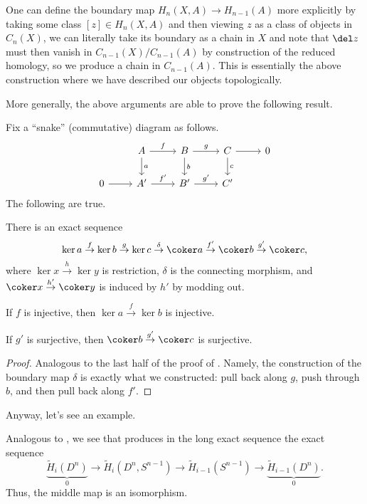 \documentclass[../notes.tex]{subfiles}
\begin{document}
\begin{remark}
	One can define the boundary map $H_n(X,A)\to H_{n-1}(A)$ more explicitly by taking some class $[z]\in H_n(X,A)$ and then viewing $z$ as a class of objects in $C_n(X)$, we can literally take its boundary as a chain in $X$ and note that $\del z$ must then vanish in $C_{n-1}(X)/C_{n-1}(A)$ by construction of the reduced homology, so we produce a chain in $C_{n-1}(A)$. This is essentially the above construction where we have described our objects topologically.
\end{remark}
More generally, the above arguments are able to prove the following result.
\begin{lemma}[Snake] \label{lem:snake}
	Fix a ``snake'' (commutative) diagram as follows.
	\[\begin{tikzcd}
		& A & B & C & 0 \\
		0 & {A'} & {B'} & {C'}
		\arrow["g", from=1-3, to=1-4]
		\arrow[from=1-4, to=1-5]
		\arrow[from=2-1, to=2-2]
		\arrow["{f'}", from=2-2, to=2-3]
		\arrow["{g'}", from=2-3, to=2-4]
		\arrow["f", from=1-2, to=1-3]
		\arrow["a", from=1-2, to=2-2]
		\arrow["b", from=1-3, to=2-3]
		\arrow["c", from=1-4, to=2-4]
	\end{tikzcd}\]
	The following are true.
	\begin{listalph}
		\item There is an exact sequence
		\[\ker a\stackrel f\to\ker b\stackrel g\to\ker c\stackrel\delta\to\coker a\stackrel{f'}\to\coker b\stackrel{g'}\to\coker c,\]
		where $\ker x\stackrel h\to\ker y$ is restriction, $\delta$ is the connecting morphism, and $\coker x\stackrel{h'}\to\coker y$ is induced by $h'$ by modding out.
		\item If $f$ is injective, then $\ker a\stackrel f\to\ker b$ is injective.
		\item If $g'$ is surjective, then $\coker b\stackrel{g'}\to\coker c$ is surjective.
	\end{listalph}
\end{lemma}
\begin{proof}
	Analogous to the last half of the proof of . Namely, the construction of the boundary map $\delta$ is exactly what we constructed: pull back along $g$, push through $b$, and then pull back along $f'$.
\end{proof}
Anyway, let's see an example.
\begin{example} \label{ex:rel-homology-sn}
	Analogous to , we see that  produces in the long exact sequence the exact sequence
	\[\underbrace{\widetilde H_i\left(D^n\right)}_0\to\widetilde H_i\left(D^n,S^{n-1}\right)\to\widetilde H_{i-1}\left(S^{n-1}\right)\to\underbrace{\widetilde H_{i-1}\left(D^n\right)}_0.\]
	Thus, the middle map is an isomorphism.
\end{example}
\end{document}
